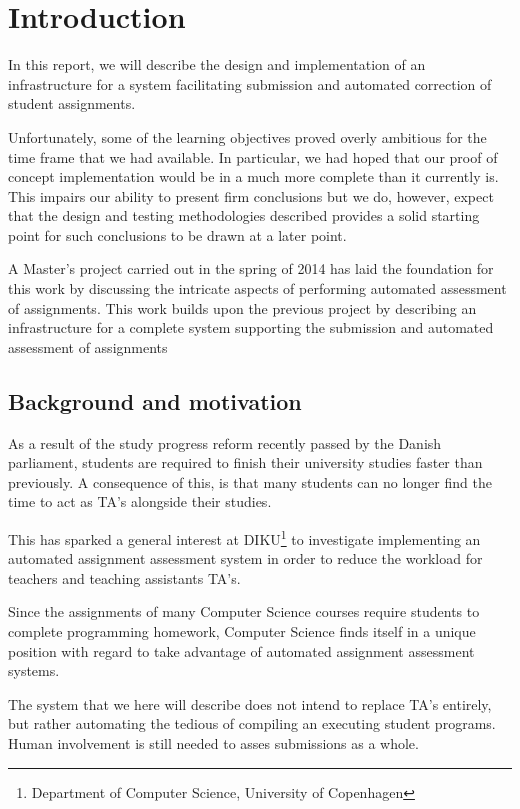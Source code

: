 \chapter{Introduction}
In this report, we will describe the design and implementation of an
infrastructure for a system facilitating submission and automated
correction of student assignments.

Unfortunately, some of the learning objectives proved overly ambitious
for the time frame that we had available. In particular, we had hoped
that our proof of concept implementation would be in a much more
complete than it currently is. This impairs our ability to present
firm conclusions but we do, however, expect that the design and
testing methodologies described provides a solid starting point for
such conclusions to be drawn at a later point.

A Master's project carried out in the spring of 2014 has laid the
foundation for this work by discussing the intricate aspects of
performing automated assessment of assignments\cite{onlineta}. This
work builds upon the previous project by describing an infrastructure
for a complete system supporting the submission and automated
assessment of assignments 

\section{Background and motivation}
As a result of the study progress reform recently passed by the Danish
parliament, students are required to finish their university studies
faster than previously\cite{reform}. A consequence of this, is that many students
can no longer find the time to act as TA's alongside their studies.

This has sparked a general interest at DIKU\footnote{Department of
  Computer Science, University of Copenhagen} to investigate
implementing an automated assignment assessment system in order to
reduce the workload for teachers and teaching assistants TA's.

Since the assignments of many Computer Science courses require
students to complete programming homework, Computer Science finds
itself in a unique position with regard to take advantage of automated assignment
assessment systems.

The system that we here will describe does not intend to replace TA's
entirely, but rather automating the tedious of compiling an executing
student programs. Human involvement is still needed to asses
submissions as a whole.

